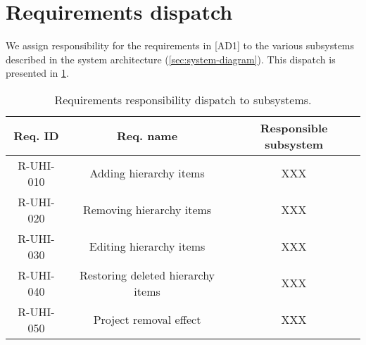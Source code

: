 \section{Requirements dispatch}
We assign responsibility for the requirements in [AD1] to the various subsystems
described in the system architecture (\cref{sec:system-diagram}). This dispatch
is presented in \cref{tab:req-dispatch}.

\begin{table}
  \caption{\label{tab:req-dispatch} Requirements responsibility dispatch to
    subsystems.}
  \begin{tabular}{| c | c | c |} \hline
    \textbf{Req. ID} & \textbf{Req. name} & \textbf{Responsible subsystem} \\ \hline
    R-UHI-010 & Adding hierarchy items & XXX \\ \hline
    R-UHI-020 & Removing hierarchy items & XXX \\ \hline
    R-UHI-030 & Editing hierarchy items & XXX \\ \hline
    R-UHI-040 & Restoring deleted hierarchy items & XXX \\ \hline
    R-UHI-050 & Project removal effect & XXX \\ \hline
  \end{tabular}
\end{table}